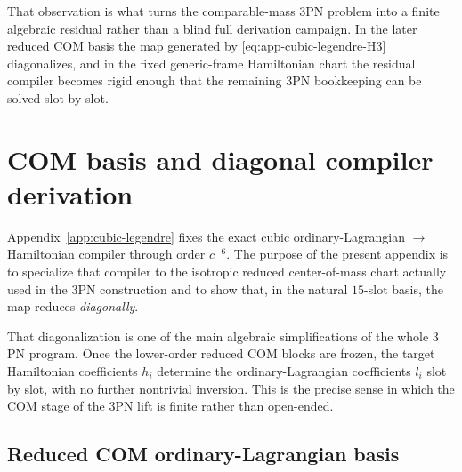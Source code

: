 \documentclass[11pt]{article}
\begin{document}
That observation is what turns the comparable-mass $3$PN problem into a finite
algebraic residual rather than a blind full derivation campaign.  In the later
reduced COM basis the map generated by
\eqref{eq:app-cubic-legendre-H3} diagonalizes, and in the fixed generic-frame
Hamiltonian chart the residual compiler becomes rigid enough that the remaining
$3$PN bookkeeping can be solved slot by slot.


\section{COM basis and diagonal compiler derivation}
\label{app:com-compiler}

Appendix~\ref{app:cubic-legendre} fixes the exact cubic ordinary-Lagrangian
$\to$ Hamiltonian compiler through order $c^{-6}$.  The purpose of the present
appendix is to specialize that compiler to the isotropic reduced
center-of-mass chart actually used in the $3$PN construction and to show that,
in the natural $15$-slot basis, the map reduces \emph{diagonally}.

That diagonalization is one of the main algebraic simplifications of the whole
$3$PN program.  Once the lower-order reduced COM blocks are frozen, the target
Hamiltonian coefficients $h_i$ determine the ordinary-Lagrangian coefficients
$l_i$ slot by slot, with no further nontrivial inversion.  This is the precise
sense in which the COM stage of the $3$PN lift is finite rather than open-ended.

\subsection{Reduced COM ordinary-Lagrangian basis}
\label{app:com-compiler-ordinary}
\end{document}

